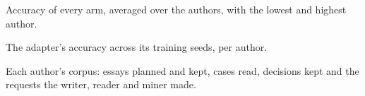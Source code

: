 \begin{table}[t]
\centering\small

\caption{Accuracy of every arm, averaged over the authors, with the lowest and highest
author.}
\label{tab:study-arms}
\end{table}

\begin{table}[t]
\centering\small

\caption{The adapter's accuracy across its training seeds, per author.}
\label{tab:study-spread}
\end{table}

\begin{table}[t]
\centering\small

\caption{Each author's corpus: essays planned and kept, cases read, decisions kept and the
requests the writer, reader and miner made.}
\label{tab:study-corpora}
\end{table}
